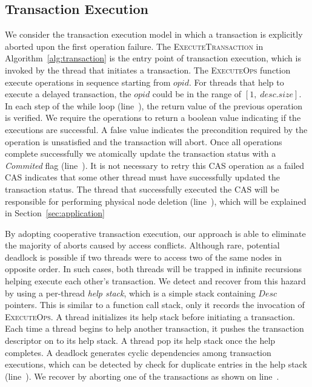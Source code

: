 \documentclass[10pt,conference,compsocconf]{IEEEtran}
\begin{document}
\subsection{Transaction Execution}
\label{sec:txnexec}
We consider the transaction execution model in which a transaction is explicitly aborted upon the first operation failure.
The \textsc{ExecuteTransaction} in Algorithm~\ref{alg:transaction} is the entry point of transaction execution, which is invoked by the thread that initiates a transaction.
The \textsc{ExecuteOps} function execute operations in sequence starting from $opid$.
For threads that help to execute a delayed transaction, the $opid$ could be in the range of $[1,\;desc.size]$.
In each step of the while loop (line~), the return value of the previous operation is verified.
We require the operations to return a boolean value indicating if the executions are successful.
A false value indicates the precondition required by the operation is unsatisfied and the transaction will abort. 
Once all operations complete successfully we atomically update the transaction status with a \emph{Commited} flag (line~).
It is not necessary to retry this CAS operation as a failed CAS indicates that some other thread must have successfully updated the transaction status.
The thread that successfully executed the CAS will be responsible for performing physical node deletion (line~), which will be explained in Section~\ref{sec:application}

By adopting cooperative transaction execution, our approach is able to eliminate the majority of aborts caused by access conflicts.
Although rare, potential deadlock is possible if two threads were to access two of the same nodes in opposite order.
In such cases, both threads will be trapped in infinite recursions helping execute each other's transaction.
We detect and recover from this hazard by using a per-thread \emph{help stack}, which is a simple stack containing $Desc$ pointers. 
This is similar to a function call stack, only it records the invocation of \textsc{ExecuteOps}.
A thread initializes its help stack before initiating a transaction.
Each time a thread begins to help another transaction, it pushes the transaction descriptor on to its help stack.
A thread pop its help stack once the help completes.
A deadlock generates cyclic dependencies among transaction executions, which can be detected by check for duplicate entries in the help stack (line~). 
We recover by aborting one of the transactions as shown on line~.
\end{document}
